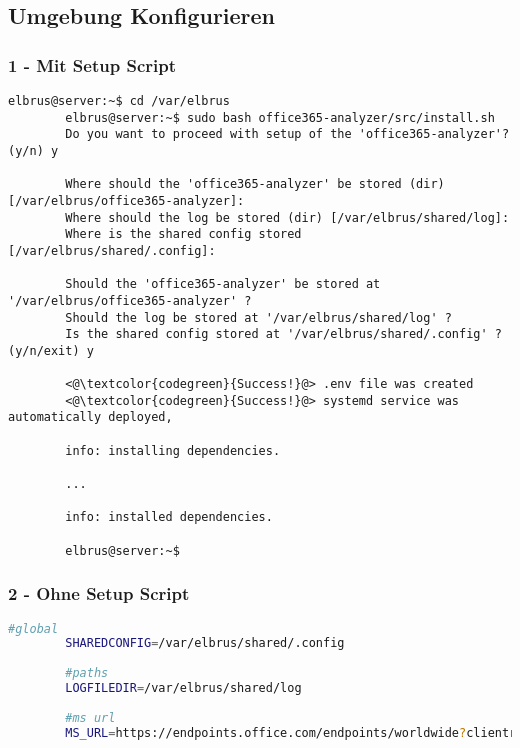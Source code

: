 	\subsection[file config]{Umgebung Konfigurieren}
	\subsubsection{1 - Mit Setup Script}
	
	\lstset{style=commands}
	\begin{lstlisting}[caption={Ausführen des 'install.sh' Scripts.}]
		elbrus@server:~$ cd /var/elbrus
		elbrus@server:~$ sudo bash office365-analyzer/src/install.sh
		Do you want to proceed with setup of the 'office365-analyzer'? (y/n) y
		
		Where should the 'office365-analyzer' be stored (dir) [/var/elbrus/office365-analyzer]:
		Where should the log be stored (dir) [/var/elbrus/shared/log]:
		Where is the shared config stored [/var/elbrus/shared/.config]:
		
		Should the 'office365-analyzer' be stored at '/var/elbrus/office365-analyzer' ?
		Should the log be stored at '/var/elbrus/shared/log' ?
		Is the shared config stored at '/var/elbrus/shared/.config' ? (y/n/exit) y
		
		<@\textcolor{codegreen}{Success!}@> .env file was created
		<@\textcolor{codegreen}{Success!}@> systemd service was automatically deployed,
		
		info: installing dependencies.
		
		...
		
		info: installed dependencies.
		
		elbrus@server:~$	
	\end{lstlisting}
	
	\subsubsection{2 - Ohne Setup Script}
	
	\lstset{style=files}
	\begin{lstlisting}[caption={Anhand von '.env.example' eigene '.env' Datei anlegen.}, language=bash]
		#global
		SHAREDCONFIG=/var/elbrus/shared/.config
		
		#paths
		LOGFILEDIR=/var/elbrus/shared/log
		
		#ms url
		MS_URL=https://endpoints.office.com/endpoints/worldwide?clientrequestid=b10c5ed1-bad1-445f-b386-b919946339a7
	\end{lstlisting}
	\newpage

